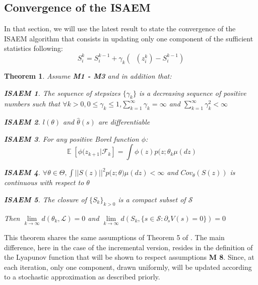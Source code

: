 \documentclass{article}
\theoremstyle{plain}
\newtheorem{assumption_saem}{ISAEM}
\DeclareMathOperator*{\E}{\mathbb{E}}
\DeclareMathOperator*{\St}{\tilde{S}}
\theoremstyle{plain}
\newtheorem{thm}{Theorem}
\theoremstyle{definition}
\begin{document}
\subsection{Convergence of the ISAEM}
In that section, we will use the latest result to state the convergence of the ISAEM algorithm that consists in updating only one component of the sufficient statistics following:
\begin{equation}
S_i^{k} = S_i^{k-1} + \gamma_k(\St(z_i^{k})-S_i^{k-1})
\end{equation}
\newpage
\begin{thm} Assume \textbf{M1 - M3} and in addition that:
\begin{assumption_saem}
The sequence of stepsizes $\{\gamma_k\}$ is a decreasing sequence of positive numbers such that $\forall k >0, 0 \leq \gamma_k \leq 1$,$\sum_{k=1}^{\infty}{\gamma_k} = \infty$ and $\sum_{k=1}^{\infty}{\gamma_k^2} < \infty$
\end{assumption_saem}

\begin{assumption_saem}
$l(\theta)$ and $\hat{\theta}(s)$ are differentiable
\end{assumption_saem}

\begin{assumption_saem}
For any positive Borel function $\phi$:
\begin{equation}
\E [\phi(z_{k+1}|\mathcal{F}_k] = \int{\phi(z)p(z;\theta_k}\mu(dz)
\end{equation}
\end{assumption_saem}

\begin{assumption_saem}
$\forall \theta \in \Theta, \int{||S(z)||^2p(z;\theta})\mu(dz) < \infty$ and $Cov_{\theta}(S(z))$ is continuous with respect to $\theta$
\end{assumption_saem}

\begin{assumption_saem}
The closure of $\{S_k\}_{k>0}$ is a compact subset of $\mathcal{S}$
\end{assumption_saem}

Then $\lim \limits_{k \to \infty} d(\theta_k, \mathcal{L}) = 0 $ and $\lim \limits_{k \to \infty} d(S_k, \{s \in \mathcal{S}: \partial_s V(s) = 0\}) = 0 $ 
\end{thm}

This theorem shares the same assumptions of Theorem 5 of \citep{lavielle}. The main difference, here in the case of the incremental version, resides in the definition of the Lyapunov function that will be shown to respect assumptions \textbf{M 8}. Since, at each iteration, only one component, drawn uniformly, will be updated according to a stochastic approximation as described priorly.\\
\end{document}

